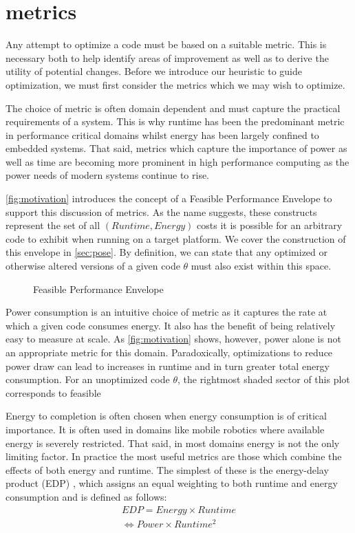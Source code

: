 \section{metrics}
\label{sec:metrics}
Any attempt to optimize a code must be based on a suitable metric.
This is necessary both to help identify areas of improvement as well as to derive the utility of potential changes.
Before we introduce our heuristic to guide optimization, we must first consider the metrics which we may wish to optimize. 

The choice of metric is often domain dependent and must capture the practical requirements of a system.
This is why runtime has been the predominant metric in performance critical domains whilst energy has been largely confined to embedded systems.
That said, metrics which capture the importance of power as well as time are becoming more prominent in high performance computing as the power needs of modern systems continue to rise.

\autoref{fig:motivation} introduces the concept of a Feasible Performance Envelope to support this discussion of metrics.  As the name suggests, these constructs represent the set of all $(Runtime, Energy)$ costs it is possible for an arbitrary code to exhibit when running on a target platform. We cover the construction of this envelope in \ref{sec:pose}.
By definition, we can state that any optimized or otherwise altered versions of a given code $\theta$ must also exist within this space.

\begin{figure}
\centering

\caption{Feasible Performance Envelope}
\label{fig:motivation}
\end{figure}

Power consumption is an intuitive choice of metric as it captures the rate at which a given code consumes energy. It also has the benefit of being relatively easy to measure at scale. As \autoref{fig:motivation} shows, however, power alone is not an appropriate metric for this domain. Paradoxically, optimizations to reduce power draw can lead to increases in runtime and in turn greater total energy consumption. For an unoptimized code $\theta$, the rightmost shaded sector of this plot corresponds to feasible  

Energy to completion is often chosen when energy consumption is of critical importance. It is often used in domains like mobile robotics where available energy is severely restricted. That said, in most domains energy is not the only limiting factor. In practice the most useful metrics are those which combine the effects of both energy and runtime. The simplest of these is the energy-delay product (EDP) \cite{gonzales:1995aa}, which assigns an equal weighting to both runtime and energy consumption and is defined as follows:
\begin{align}
  EDP = Energy \times Runtime \nonumber \\
      \Leftrightarrow Power \times Runtime^{2} 
  \label{eq:edp}
\end{align}

